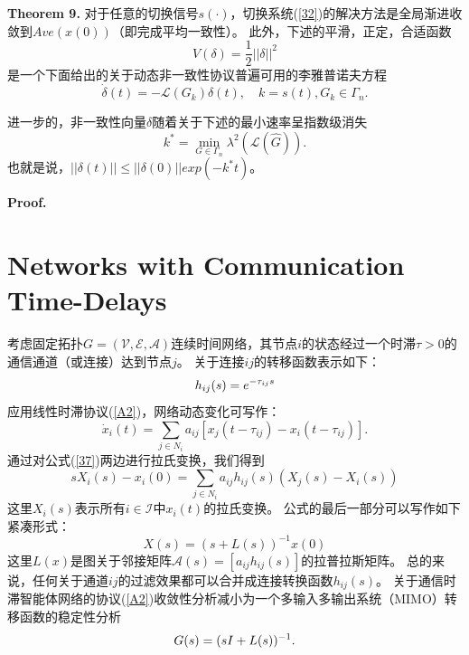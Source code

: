 \documentclass{article}
\begin{document}
\noindent \textbf{Theorem 9.} 对于任意的切换信号$s(\cdot)$，切换系统(\ref{32})的解决方法是全局渐进收敛到$Ave(x(0))$（即完成平均一致性）。
此外，下述的平滑，正定，合适函数
\begin{equation}
    V(\delta) = \frac{1}{2}||\delta||^2
    \label{33}
    \tag{33}
\end{equation}
是一个下面给出的关于动态非一致性协议普遍可用的李雅普诺夫方程
\begin{equation}
    \dot{\delta}(t) = -\mathcal{L}(G_k)\delta(t),\quad k=s(t),G_k\in \Gamma_n.
    \tag{34}
    \label{34}
\end{equation}

进一步的，非一致性向量$\delta$随着关于下述的最小速率呈指数级消失
\begin{equation}
    k^* = \min_{G\in \Gamma_n} \lambda^2(\mathcal{L}(\hat{G})).
    \tag{35}
    \label{35}
\end{equation}
也就是说，$||\delta(t)||\le ||\delta(0)||exp(-k^*t)$。

\noindent \textbf{Proof.}




\section{Networks with Communication Time-Delays}
考虑固定拓扑$G=(\mathcal{V}, \mathcal{E}, \mathcal{A})$连续时间网络，其节点$i$的状态经过一个时滞$\tau > 0$的通信通道（或连接）达到节点$j$。
关于连接$ij$的转移函数表示如下：
\begin{equation}
    h_{ij}(s) = e^{-\tau_{ij}s}
    \notag
\end{equation}
应用线性时滞协议(\ref{A2})，网络动态变化可写作：
\begin{equation}
    \dot{x}_i(t) = \sum_{j\in N_i} a_{ij} [x_j(t-\tau_{ij}) - x_i(t-\tau_{ij})].
    \tag{37}
    \label{37}
\end{equation}
通过对公式(\ref{37})两边进行拉氏变换，我们得到
\begin{equation}
    sX_i(s) - x_i(0) = \sum_{j\in N_i} a_{ij} h_{ij}(s) (X_j(s) - X_i(s))
    \tag{38}
    \label{38}
\end{equation}
这里$X_i(s)$表示所有$i\in \mathcal{I}$中$x_i(t)$的拉氏变换。
公式的最后一部分可以写作如下紧凑形式：
\begin{equation}
    X(s) = (s+L(s))^{-1}x(0)
    \tag{39}
    \label{39}
\end{equation}
这里$L(x)$是图关于邻接矩阵$\mathcal{A}(s) = [a_{ij}h_{ij}(s)]$的拉普拉斯矩阵。
总的来说，任何关于通道$ij$的过滤效果都可以合并成连接转换函数$h_{ij}(s)$。
关于通信时滞智能体网络的协议(\ref{A2})收敛性分析减小为一个多输入多输出系统（MIMO）转移函数的稳定性分析
\begin{equation}
    G(s) = (sI+L(s))^{-1}.
    \notag
\end{equation}
\end{document}
